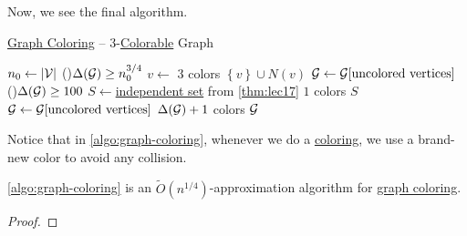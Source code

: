Now, we see the final algorithm.

\begin{algorithm}[H]\label{algo:graph-coloring}
	\DontPrintSemicolon
	\caption{\hyperref[prb:graph-coloring]{Graph Coloring} -- \(3\)-\hyperref[def:coloring]{Colorable} Graph}
	\BlankLine
	\(n_0\gets \left\vert \mathcal{\MakeUppercase{v}}  \right\vert \)\;
	\While(){\(\Delta (\mathcal{\MakeUppercase{g}} ) \geq n_0 ^{3 / 4}\)}{
	\(v\gets\)\;
	\(3\) colors \(\left\{ v \right\} \cup N(v)\)
	\(\mathcal{\MakeUppercase{g}} \gets \mathcal{\MakeUppercase{g}} [\text{uncolored vertices}]\)\;
	}
	\While(){\(\Delta (\mathcal{\MakeUppercase{g}} ) \geq 100\)}{
		\(S\gets\)\hyperref[def:independent-set]{independent set} from \autoref{thm:lec17}
		\(1\) colors \(S\)\;
		\(\mathcal{\MakeUppercase{g}} \gets \mathcal{\MakeUppercase{g}} [\text{uncolored vertices}]\)\;
	}
	\(\Delta (\mathcal{\MakeUppercase{g}} ) + 1\) colors \(\mathcal{\MakeUppercase{g}} \)
	\;
\end{algorithm}

Notice that in \autoref{algo:graph-coloring}, whenever we do a \hyperref[def:coloring]{coloring}, we use a brand-new color to avoid any collision.

\begin{theorem}
	\autoref{algo:graph-coloring} is an \(\widetilde{O} (n^{1 / 4})\)-approximation algorithm for \hyperref[prb:graph-coloring]{graph coloring}.
\end{theorem}
\begin{proof}

\end{proof}